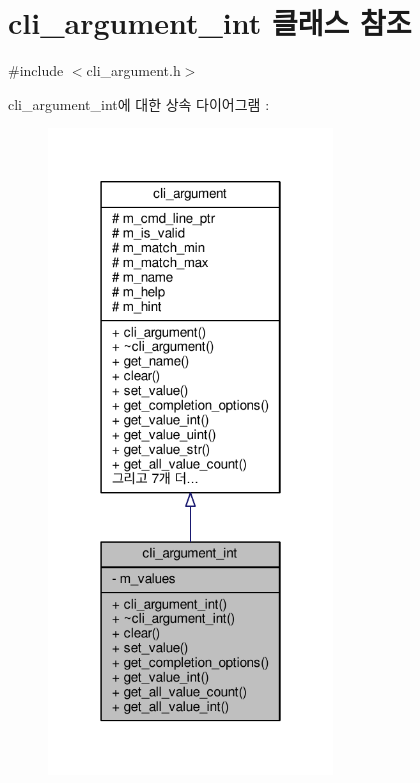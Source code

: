 \hypertarget{classcli__argument__int}{}\section{cli\+\_\+argument\+\_\+int 클래스 참조}
\label{classcli__argument__int}


{\ttfamily \#include $<$cli\+\_\+argument.\+h$>$}



cli\+\_\+argument\+\_\+int에 대한 상속 다이어그램 \+: 
\nopagebreak
\begin{figure}[H]
\begin{center}
\leavevmode
\includegraphics[width=214pt]{classcli__argument__int__inherit__graph}
\end{center}
\end{figure}


